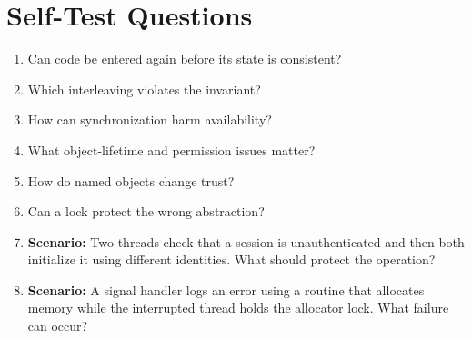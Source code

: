 \documentclass[11pt,letterpaper]{article}
\begin{document}
\section{Self-Test Questions}
\begin{enumerate}
\item Can code be entered again before its state is consistent?
\item Which interleaving violates the invariant?
\item How can synchronization harm availability?
\item What object-lifetime and permission issues matter?
\item How do named objects change trust?
\item Can a lock protect the wrong abstraction?
\item \textbf{Scenario:} Two threads check that a session is unauthenticated and then both initialize it using different identities. What should protect the operation?
\item \textbf{Scenario:} A signal handler logs an error using a routine that allocates memory while the interrupted thread holds the allocator lock. What failure can occur?
\end{enumerate}
\clearpage
\end{document}
